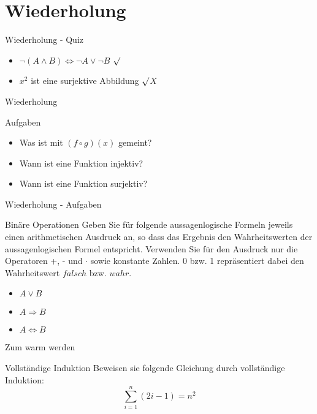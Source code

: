 \section{Wiederholung} 
\begin{frame} {Wiederholung - Quiz}
    \begin{itemize}
        \item $\neg (A \land B) \Leftrightarrow \neg A \lor \neg B$
         {\color{darkgreen}$\surd$}\\
        \color{black}
        
        \item $x^2$ ist eine surjektive Abbildung
         {\color{darkgreen}$\surd$\color{red}$X$}\\
        \color{black}
    \end{itemize}
\end{frame}
\begin{frame}{Wiederholung}
    \begin{exampleblock}{Aufgaben}
        \begin{itemize}
            \item Was ist mit $\left( f\circ g \right)\left( x \right)$ gemeint?
            \item Wann ist eine Funktion injektiv?
            \item Wann ist eine Funktion surjektiv?
        \end{itemize}
    \end{exampleblock}
\end{frame}
\begin{frame} {Wiederholung - Aufgaben}
    \begin{block}{Binäre Operationen}
        Geben Sie für folgende aussagenlogische Formeln jeweils einen 
        arithmetischen Ausdruck an, so dass das Ergebnis 
        den Wahrheitswerten der aussagenlogischen Formel entspricht. 
        Verwenden Sie für den Ausdruck nur die Operatoren +, - und 
        $\cdot$ sowie konstante Zahlen. 0 bzw. 1 repräsentiert dabei den
         Wahrheitswert $falsch$ bzw. $wahr$.
         
         \begin{itemize}
            \item $ A \lor B$
            
            \item $ A \Rightarrow B $
            
            \item $ A \Leftrightarrow B $
         \end{itemize}
    \end{block}
\end{frame}
\begin{frame}{Zum warm werden}
    \begin{block}{Vollständige Induktion}
        Beweisen sie folgende Gleichung durch vollständige Induktion:\\
        \[ \sum_{i=1}^{n}(2i-1) = n^2 \]
    \end{block}
\end{frame}

